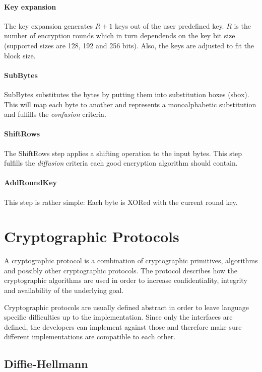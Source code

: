 \paragraph{Key expansion}
The key expansion generates $R + 1$ keys out of the user predefined key.
$R$ is the number of encryption rounds which in turn dependends on the key 
bit size (supported sizes are 128, 192 and 256 bits). Also,
the keys are adjusted to fit the block size.

\paragraph{SubBytes}
SubBytes substitutes the bytes by putting them into substitution boxes (sbox).
This will map each byte to another and represents a monoalphabetic substitution
and fulfills the \textit{confusion} criteria.

\paragraph{ShiftRows}
The ShiftRows step applies a shifting operation to the input bytes. This step
fulfills the \textit{diffusion} criteria each good encryption algorithm should
contain.

\paragraph{AddRoundKey}
This step is rather simple: Each byte is XORed with the current round key.

\cite{daemen20018}

\section{Cryptographic Protocols}

A cryptographic protocol is a combination of cryptographic primitives,
algorithms and possibly other cryptographic protocols. The protocol describes
how the cryptographic algorithms are used in order to increase confidentiality,
integrity and availability of the underlying goal.

Cryptographic protocols are usually defined abstract in order to leave language
specific difficulties up to the implementation. Since only the interfaces are
defined, the developers can implement against those and therefore make sure
different implementations are compatible to each other.

\subsection{Diffie-Hellmann}

